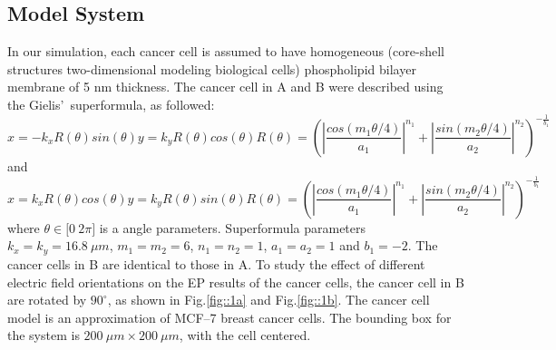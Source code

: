 \documentclass[conference]{IEEEtran}
\begin{document}
\subsection{Model System}
In our simulation, each cancer cell is assumed to have homogeneous (core-shell structures two-dimensional modeling biological cells) phospholipid bilayer membrane of 5 nm thickness. The cancer cell in A and B were described using the Gielis'~superformula\cite{mescia2017modeling}, as followed:
\begin{subequations}
	\begin{equation}
		x=-k_x R(\theta)sin(\theta)
	\end{equation}
	\begin{equation}
		y=k_y R(\theta)cos(\theta)
	\end{equation}
	\begin{equation}
		R(\theta)=\left(\left| \frac{cos(m_1\theta/4)}{a_1} \right|^{n_1}+\left|\frac{sin(m_2\theta/4)}{a_2}\right|^{n_2}\right)^{-\frac{1}{b_1}}
	\end{equation}
\end{subequations}
and 
\begin{subequations}
	\begin{equation}
		x=k_x R(\theta)cos(\theta)
	\end{equation}
	\begin{equation}
		y=k_y R(\theta)sin(\theta)
	\end{equation}
	\begin{equation}
		R(\theta)=\left(\left| \frac{cos(m_1\theta/4)}{a_1} \right|^{n_1}+\left|\frac{sin(m_2\theta/4)}{a_2}\right|^{n_2}\right)^{-\frac{1}{b_1}}
	\end{equation}
\end{subequations}
where $\theta\in\lbrack 0~2\pi \rbrack$ is a angle parameters. Superformula parameters $k_x=k_y=16.8~\mu m$, $m_1=m_2=6$, $n_1=n_2=1$, $a_1=a_2=1$ and $b_1=-2$. The cancer cells in B are identical to those in A. To study the effect of different electric field orientations on the EP results of the cancer cells, the cancer cell in B are rotated by $90^\circ$, as shown in Fig.\ref{fig::1a} and Fig.\ref{fig::1b}. The cancer cell model is an approximation of MCF--7 breast cancer cells\cite{medlock2017cancer}. The bounding box for the system is $200~\mu m \times 200 ~\mu m$, with the cell centered.
\end{document}
